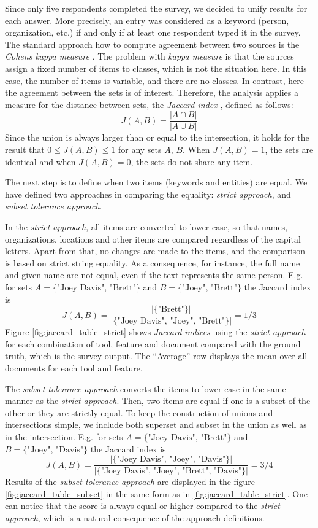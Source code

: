 \documentclass[
  digital, %
  notable,   %
  nolof,     %
  nolot,     %
]{fithesis3}
\begin{document}
Since only five respondents completed the survey, we decided to unify results for each answer.
More precisely, an entry was considered as a keyword (person, organization, etc.) if and only if at least one respondent typed it in the survey.
The standard approach how to compute agreement between two sources is the \textit{Cohens kappa measure} \cite{smeeton1985kappa}.
The problem with \textit{kappa measure} is that the sources assign a fixed number of items to classes, which is not the situation here.
In this case, the number of items is variable, and there are no classes.
In contrast, here the agreement between the sets is of interest.
Therefore, the analysis applies a measure for the distance between sets, the \textit{Jaccard index} \cite{levandowsky1971distance}, defined as follows:
$$
J(A, B) = \frac{|A \cap B|}{|A \cup B|}
$$
Since the union is always larger than or equal to the intersection, it holds for the result that $0 \leq J(A, B) \leq 1$ for any sets $A$, $B$. 
When $J(A,B)=1$, the sets are identical and when $J(A,B)=0$, the sets do not share any item.

The next step is to define when two items (keywords and entities) are equal.
We have defined two approaches in comparing the equality: \textit{strict approach}, and \textit{subset tolerance approach}.

In the \textit{strict approach}, all items are converted to lower case, so that names, organizations, locations and other items are compared regardless of the capital letters.
Apart from that, no changes are made to the items, and the comparison is based on strict string equality.
As a consequence, for instance, the full name and given name are not equal, even if the text represents the same person. 
E.g. for sets $A=\{\text{"Joey Davis", "Brett"}\}$ and $B=\{\text{"Joey", "Brett"}\}$ the Jaccard index is 
$$
J(A, B) = \frac{|\{\text{"Brett"}\}|}{|\{\text{"Joey Davis", "Joey", "Brett"}\}|} = 1/3
$$
Figure \ref{fig:jaccard_table_strict} shows \textit{Jaccard indices} using the \textit{strict approach} for each combination of tool, feature and document compared with the ground truth, which is the survey output.
The ``Average'' row displays the mean over all documents for each tool and feature.

The \textit{subset tolerance approach} converts the items to lower case in the same manner as the \textit{strict approach}.
Then, two items are equal if one is a subset of the other or they are strictly equal.
To keep the construction of unions and intersections simple, we include both superset and subset in the union as well as in the intersection.
E.g. for sets $A=\{\text{"Joey Davis", "Brett"}\}$ and $B=\{\text{"Joey", "Davis"}\}$ the Jaccard index is 
$$
J(A, B) = \frac{|\{\text{"Joey Davis", "Joey", "Davis"}\}|}{|\{\text{"Joey Davis", "Joey", "Brett", "Davis"}\}|} = 3/4
$$
Results of the \textit{subset tolerance approach} are displayed in the figure \ref{fig:jaccard_table_subset} in the same form as in \ref{fig:jaccard_table_strict}.
One can notice that the score is always equal or higher compared to the \textit{strict approach}, which is a natural consequence of the approach definitions.
\end{document}
